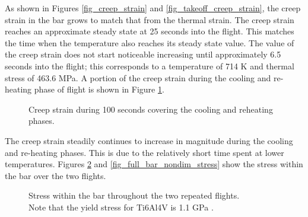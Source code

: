 \documentclass[conf]{new-aiaa}
\begin{document}
As shown in Figures \ref{fig_creep_strain}
and \ref{fig_takeoff_creep_strain}, the creep strain in the bar 
grows to match that from the thermal strain. 
The creep strain reaches an approximate steady state 
at 25 seconds into the flight. 
This matches the time when the temperature also reaches
its steady state value.
The value of the creep strain does not start noticeable increasing
until approximately 6.5 seconds into the flight;
this corresponds to a temperature of 714 K
and thermal stress of 463.6 MPa.
A portion of the creep strain during the cooling and re-heating
phase of flight is shown in Figure \ref{fig_touchdown_creep_strain}.

\begin{figure}[H]
  \centering
  \caption{ Creep strain during 100 seconds covering the cooling and reheating phases.}
  \label{fig_touchdown_creep_strain}
\end{figure}

The creep strain steadily continues to increase in magnitude 
during the cooling and re-heating phases.
This is due to the relatively short time spent at lower
temperatures.
Figures \ref{fig_full_bar_stress} and 
\ref{fig_full_bar_nondim_stress} show
the stress within the bar over the two flights.


\begin{figure}[H]
  \centering
  \caption{ Stress within the bar throughout the two repeated flights. \\
            Note that the yield stress for Ti6Al4V is 1.1 GPa 
            \cite{boyer_materials_properties_handbook_titanium_alloys}. }
  \label{fig_full_bar_stress}
\end{figure}
\end{document}
